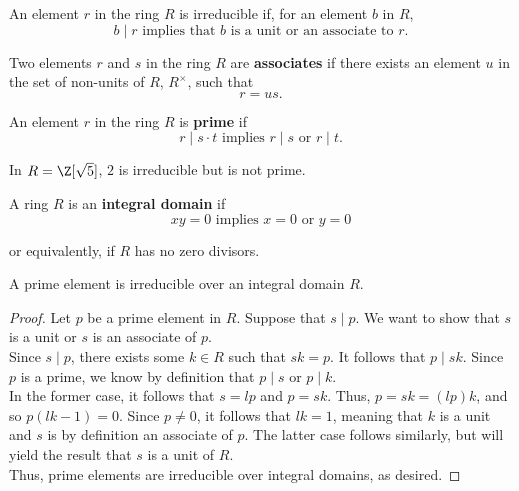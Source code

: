 \documentclass[11pt]{article}
\begin{document}
\begin{definition}[Irreducible]
An element $r$ in the ring $R$ is irreducible if, for an element $b$ in $R$, 
\[
    b \mid r \text{ implies that } b \text { is a unit or an associate to } r.
\]
\end{definition}

\begin{definition}[Associates]
Two elements $r$ and $s$ in the ring $R$ are \textbf{associates} if there exists an element $u$ in the set of non-units of $R$, $R^{\times}$, such that
\[
    r = us.
\]
\end{definition}

\begin{definition}[Prime]
An element $r$ in the ring $R$ is \textbf{prime} if 
\[
    r \mid s \cdot t \text{ implies } r \mid s \text{ or } r \mid t.
\]
\end{definition}

\begin{remark} 
In $R = \Z[\sqrt{5}]$, $2$ is irreducible but is not prime. \\
\end{remark}

\begin{definition}
A ring $R$ is an \textbf{integral domain} if 
\[
    xy = 0 \text{ implies } x = 0 \text{ or } y = 0
\] 

or equivalently, if $R$ has no zero divisors.
\end{definition}
\begin{lemma}
A prime element is irreducible over an integral domain $R$.
\end{lemma}

\begin{proof}
Let $p$ be a prime element in $R$. Suppose that $s \mid p$. We want to show that $s$ is a unit or $s$ is an associate of $p$. \\

Since $s \mid p$, there exists some $k \in R$ such that $sk = p$. It follows that $p \mid sk$. Since $p$ is a prime, we know by definition that
$p \mid s$ or $p \mid k$. \\

In the former case, it follows that $s = lp$ and $p = sk$. Thus, $p = sk = (lp)k$, and so $p(lk - 1) = 0$. Since $p \neq 0$, it follows that $lk = 1$, meaning that
$k$ is a unit and $s$ is by definition an associate of $p$. The latter case follows similarly, but will yield the result that $s$ is a unit of $R$. \\

Thus, prime elements are irreducible over integral domains, as desired.
\end{proof}
\end{document}
